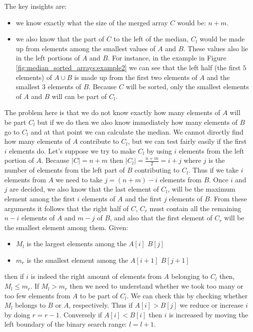 The key insights are:
\begin{itemize}
	\item we know exactly what the size of the merged array $C$ would be: $n+m$.
	\item we also know that the part of $C$ to the left of the median, $C_l$ would be made up from elements among the smallest values of $A$
	and $B$. These values also lie in the left portions of $A$ and $B$. For instance, in the example in Figure \ref{fig:median_sorted_arrays:example2} we
	can see that the left half (the first $5$ elements) of $A \cup B$ is made  up from the first two elements
	of $A$ and the smallest $3$ elements of $B$. Because $C$ will be sorted, only the smallest
	elements of $A$ and $B$ will can be part of $C_l$.
\end{itemize}
The problem here is that we do not know exactly how many elements of $A$ will be part $C_l$ but if we do then we also know immediately how many elements of $B$ go to $C_l$
and at that point we can calculate the median.
We cannot directly find how many elements  of $A$ contribute to $C_l$, but we can test fairly easily if the first $i$ elements do.
Let's suppose we try to make $C_l$ by using $i$ elements from the left portion of $A$.
Because $|C|=n+m$ then $|C_l| = \frac{n+m}{2} = i+j$ where $j$ is the number of elements from the left part of $B$ contributing to $C_l$. 
Thus if we take $i$ elements from $A$ we need to take $j = (n+m)-i$ elements from $B$. 
Once $i$ and $j$ are decided, we also know that the last element of $C_l$, will be the maximum element among the first $i$ elements of $A$ and the first $j$ elements of $B$.
From these arguments it follows that the right half of $C$, $C_r$ must contain all the remaining $n-i$ elements of $A$ and $m-j$ of $B$, 
and also that the first element of $C_r$ will be the smallest element among them.
Given:
\begin{itemize}
	\item $M_l$ is the largest elements among the $A[i]$  $B[j]$
	\item $m_r$ is the smallest element among the $A[i+1]$  $B[j+1]$
\end{itemize} 
then if $i$ is indeed the right amount of elements from $A$ belonging to $C_l$ then, $M_l \leq m_r$.
If $M_l > m_r$ then we need to understand whether we took too many or too few elements from $A$ to be part of $C_l$. 
We can check this by checking whether  $M_l$ belongs to $B$ or $A$, respectively. 
Thus if $A[i] > B[j]$ we reduce or increase $i$ by doing $r = r-1$. 
Conversely if $A[i] < B[i]$ then $i$ is increased by moving the left boundary of the binary search range: $l = l+1$.

